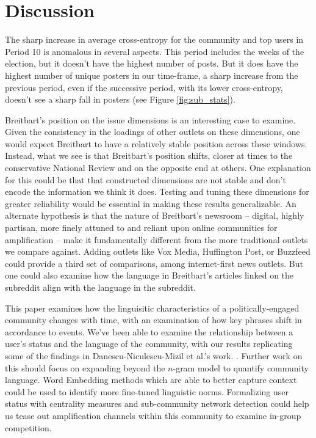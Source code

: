 \section{Discussion}

The sharp increase in average cross-entropy for the community and top users in Period 10 is anomalous in several aspects. This period includes the weeks of the election, but it doesn't have the highest number of posts. But it does have the highest number of unique posters in our time-frame, a sharp increase from the previous period, even if the successive period, with its lower cross-entropy, doesn't see a sharp fall in posters (see Figure \ref{fig:sub_stats}).

Breitbart's position on the issue dimensions is an interesting case to examine. Given the consistency in the loadings of other outlets on these  dimensions, one would expect Breitbart to have a relatively stable position across these windows. Instead, what we see is that Breitbart's position shifts, closer at times to the conservative National Review and on the opposite end at others. One explanation for this could be that that constructed dimensions are not stable and don't encode the information we think it does. Testing and tuning these dimensions for greater reliability would be essential in making these results generalizable. An alternate hypothesis is that the nature of Breitbart's newsroom -- digital, highly partisan, more finely attuned to and reliant upon online communities for amplification -- make it fundamentally different from the more traditional outlets we compare against. Adding outlets like Vox Media, Huffington Post, or Buzzfeed could provide a third set of comparisons, among internet-first news outlets. But one could also examine how the language in Breitbart's articles linked on the subreddit align with the language in the subreddit. 

This paper examines how the linguisitic characteristics of a politically-engaged community changes with time, with an examination of how key phrases shift in accordance to events. We've been able to examine the relationship between a user's status and the language of the community, with our results replicating some of the findings in Danescu-Niculescu-Mizil et al.'s work. \citep{danescu-niculescu-mizil_no_2013}. Further work on this should focus on expanding beyond the $n$-gram model to quantify community language. Word Embedding methods which are able to better capture context could be used to identify more fine-tuned linguistic norms. Formalizing user status with centrality measures and sub-community network detection could help us tease out amplification channels within this community to examine in-group competition.      